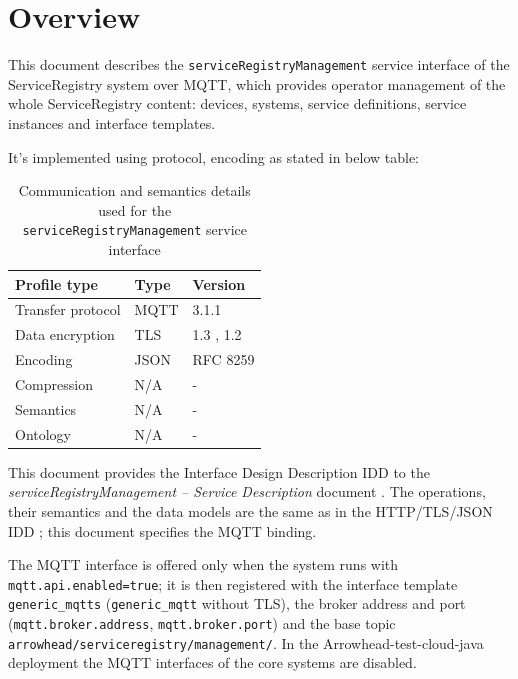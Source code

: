 \documentclass[a4paper]{arrowhead}
\begin{document}
\section{Overview}
\label{sec:overview}

This document describes the \texttt{service\allowbreak{}Registry\allowbreak{}Management} service interface of the ServiceRegistry system over MQTT, which provides operator management of the whole ServiceRegistry content: devices, systems, service definitions, service instances and interface templates.

It's implemented using protocol, encoding as stated in below table:
\begin{table}[ht!]
  \centering
  \begin{tabular}{|l|l|l|}
    \hline
    \rowcolor{gray!33} Profile type & Type & Version \\ \hline
    Transfer protocol & MQTT & 3.1.1 \cite{mqtt311} \\ \hline
    Data encryption & TLS & 1.3 \cite{rfc8446}, 1.2 \cite{rfc5246} \\ \hline
    Encoding & JSON & RFC 8259 \cite{rfc8259} \\ \hline
    Compression & N/A & - \\ \hline
    Semantics & N/A & - \\ \hline
    Ontology & N/A & - \\ \hline
  \end{tabular}
  \caption{Communication and semantics details used for the \texttt{service\allowbreak{}Registry\allowbreak{}Management} service interface}
  \label{tab:comunication_semantics_profile}
\end{table}

This document provides the Interface Design Description IDD to the \textit{serviceRegistryManagement -- Service Description} document \cite{sr-serviceRegistryManagement-sd}.
The operations, their semantics and the data models are the same as in the HTTP/TLS/JSON IDD \cite{sr-serviceRegistryManagement-http-idd}; this document specifies the MQTT binding.

The MQTT interface is offered only when the system runs with \texttt{mqtt.api.enabled=true}; it is then registered with the interface template \texttt{generic\_\allowbreak{}mqtts} (\texttt{generic\_\allowbreak{}mqtt} without TLS), the broker address and port (\texttt{mqtt.\allowbreak{}broker.\allowbreak{}address}, \texttt{mqtt.\allowbreak{}broker.\allowbreak{}port}) and the base topic \texttt{arrowhead/\allowbreak{}serviceregistry/\allowbreak{}management/\allowbreak{}}. In the Arrowhead-test-cloud-java deployment the MQTT interfaces of the core systems are disabled.
\end{document}
